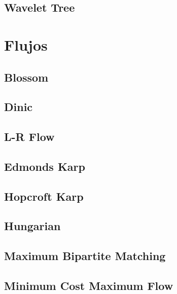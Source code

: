 \subsection{Wavelet Tree}
\raggedbottom
\hrulefill

\section{Flujos}
\subsection{Blossom}
\raggedbottom
\hrulefill
\subsection{Dinic}
\raggedbottom
\hrulefill
\subsection{L-R Flow}
\raggedbottom
\hrulefill
\subsection{Edmonds Karp}
\raggedbottom
\hrulefill
\subsection{Hopcroft Karp}
\raggedbottom
\hrulefill
\subsection{Hungarian}
\raggedbottom
\hrulefill
\subsection{Maximum Bipartite Matching}
\raggedbottom
\hrulefill
\subsection{Minimum Cost Maximum Flow}
\raggedbottom
\hrulefill
